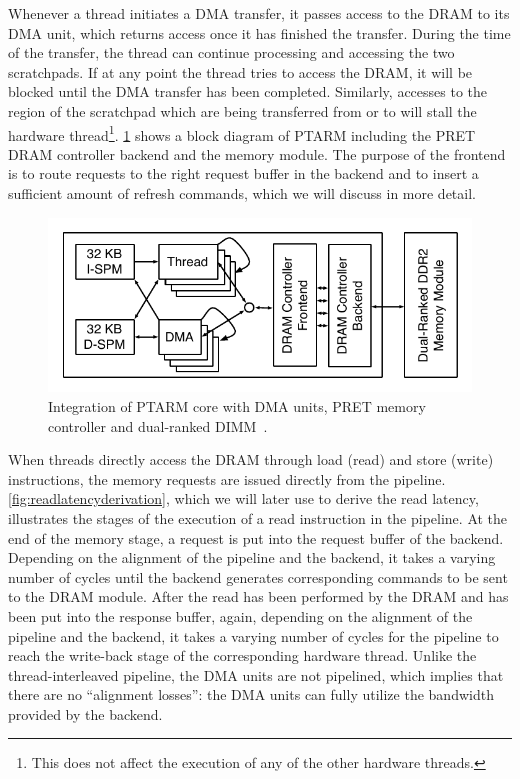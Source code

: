 Whenever a thread initiates a DMA transfer, it passes access to the DRAM to its DMA unit, which returns access once it has finished the transfer. 
During the time of the transfer, the thread can continue processing and accessing the two scratchpads.
If at any point the thread tries to access the DRAM, it will be blocked until the DMA transfer has been completed.
Similarly, accesses to the region of the scratchpad which are being transferred from or to will stall the hardware thread\footnote{This does not affect the execution of any of the other hardware threads.}.
\ref{fig:pretintegration} shows a block diagram of PTARM including the PRET DRAM controller backend and the memory module.
The purpose of the frontend is to route requests to the right request buffer in the backend and to insert a sufficient amount of refresh commands, which we will discuss in more detail.

\begin{figure}
\begin{center}
\includegraphics[width=0.7\linewidth]{figs/pret-integration}
\end{center}
\caption{Integration of PTARM core with DMA units, PRET memory controller and dual-ranked DIMM~\cite{ReinekeLiuPatelKimLee11_PRETDRAMControllerBankPrivatizationForPredictability}.}\label{fig:pretintegration} %
\end{figure}

When threads directly access the DRAM through load (read) and store (write) instructions, the memory requests are issued directly from the pipeline. 
\ref{fig:readlatencyderivation}, which we will later use to derive the read latency, illustrates the stages of the execution of a read instruction in the pipeline.
At the end of the memory stage, a request is put into the request buffer of the backend.
Depending on the alignment of the pipeline and the backend, it takes a varying number of cycles until the backend generates corresponding commands to be sent to the DRAM module.
After the read has been performed by the DRAM and has been put into the response buffer, again, depending on the alignment of the pipeline and the backend, it takes a varying number of cycles for the pipeline to reach the write-back stage of the corresponding hardware thread.
Unlike the thread-interleaved pipeline, the DMA units are not pipelined, which implies that there are no ``alignment losses'':
the DMA units can fully utilize the bandwidth provided by the backend.



